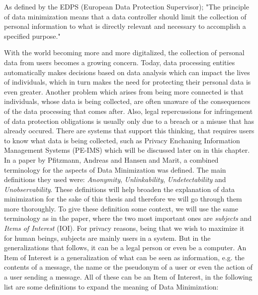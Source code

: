 As defined by the EDPS (European Data Protection Supervisor); "The principle of data minimization means that a data controller should limit the collection of personal information to what is directly relevant and necessary to accomplish a specified purpose."\cite{websiteEu} %



With the world becoming more and more digitalized, the collection of personal data from users becomes a growing concern. Today, data processing entities automatically makes decisions based on data analysis which can impact the lives of individuals, which in turn makes the need for protecting their personal data is even greater.\cite{danezis2015privacy} Another problem which arises from being more connected is that individuals, whose data is being collected, are often unaware of the consequences of the data processing that comes after. Also, legal repercussions for infringement of data protection obligations is usually only due to a breach or a misuse that has already occured. There are systems that support this thinking, that requires users to know what data is being collected, such as Privacy Enchaning Information Management Systems (PE-IMS) which will be discussed later on in this chapter. \\




In a paper by Pfitzmann, Andreas and Hansen and Marit, a combined terminology for the aspects of Data Minimization was defined. The main definitions they used were: \textit{Anonymity}, \textit{Unlinkability}, \textit{Undetectability} and \textit{Unobservability}.\cite{pfitzmann2010} These definitions will help broaden the explanation of data minimization for the sake of this thesis and therefore we will go through them more thoroughly. To give these definition some context, we will use the same terminology as in the paper, where the two most important ones are \textit{subjects} and \textit{Items of Interest} (IOI). For privacy reasons, being that we wish to maximize it for human beings, subjects are mainly users in a system. But in the generalizations that follows, it can be a legal person or even be a computer. An Item of Interest is a generalization of what can be seen as information, e.g. the contents of a message, the name or the pseudonym of a user or even the action of a user sending a message. All of these can be an Item of Interest, in the following list are some definitions to expand the meaning of Data Minimization: \\

